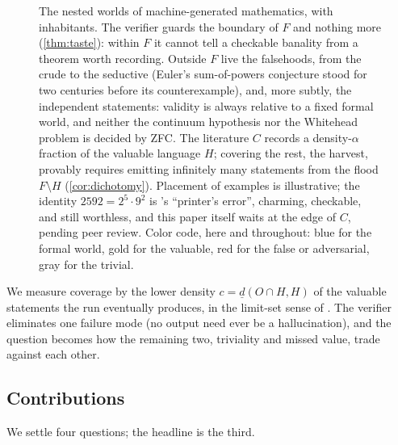 \documentclass[11pt]{article}
\numberwithin{equation}{section}
\newcommand{\Val}{H}
\newcommand{\Out}{O}
\newcommand{\dlow}[2]{\underline{d}(#1,#2)}
\newcommand{\cov}{c}
\theoremstyle{plain}
\theoremstyle{definition}
\theoremstyle{remark}
\begin{document}
\begin{figure}[t]
{
}
\caption{The nested worlds of machine-generated mathematics, with inhabitants.
The verifier guards the boundary of $F$ and nothing more (\cref{thm:taste}):
within $F$ it cannot tell a checkable banality from a theorem worth recording.
Outside $F$ live the falsehoods, from the crude to the seductive (Euler's
sum-of-powers conjecture stood for two centuries before its counterexample),
and, more subtly, the independent statements: validity is always relative to a
fixed formal world, and neither the continuum hypothesis nor the Whitehead
problem is decided by ZFC. The literature $C$ records a density-$\alpha$ fraction
of the valuable language $H$; covering the rest, the harvest, provably requires
emitting infinitely many statements from the flood $F \setminus H$
(\cref{cor:dichotomy}). Placement of examples is illustrative; the identity
$2592 = 2^5 \cdot 9^2$ is \citet{dudeney1917amusements}'s ``printer's error'',
charming, checkable, and still worthless, and this paper itself waits at the edge of $C$, pending peer review.
Color code, here and throughout: blue for
the formal world, gold for the valuable, red for the false or adversarial, gray for
the trivial.}
\label{fig:worlds}
\vspace{-4mm}
\end{figure}

We measure coverage by the lower density $\cov=\dlow{\Out\cap\Val}{\Val}$ of the valuable
statements the run eventually produces, in the limit-set sense of
\citet{kleinberg2025density}. The verifier eliminates one failure mode (no output need ever be
a hallucination), and the question becomes how the remaining two, triviality and missed value,
trade against each other.

\subsection{Contributions}
\label{sec:intro-contrib}

We settle four questions; the headline is the third.
\end{document}
